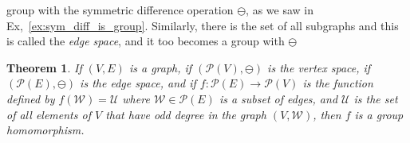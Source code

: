 \documentclass{article}
\theoremstyle{plain}
\newtheorem{theorem}{Theorem}[section]
\theoremstyle{normal}
\begin{document}
            group with the symmetric difference operation $\ominus$, as we saw
            in Ex,~\ref{ex:sym_diff_is_group}. Similarly, there is the set of
            all subgraphs and this is called the \textit{edge space}, and it
            too becomes a group with $\ominus$
            \begin{theorem}
                If $(V,E)$ is a graph, if $(\mathcal{P}(V),\ominus)$ is the
                vertex space, if $(\mathcal{P}(E),\ominus)$ is the edge space,
                and if $f:\mathcal{P}(E)\rightarrow\mathcal{P}(V)$ is the
                function defined by $f(\mathcal{W})=\mathcal{U}$ where
                $\mathcal{W}\in\mathcal{P}(E)$ is a subset of edges, and
                $\mathcal{U}$ is the set of all elements of $V$ that have
                odd degree in the graph $(V,\mathcal{W})$, then $f$ is a
                group homomorphism.
            \end{theorem}
\end{document}
